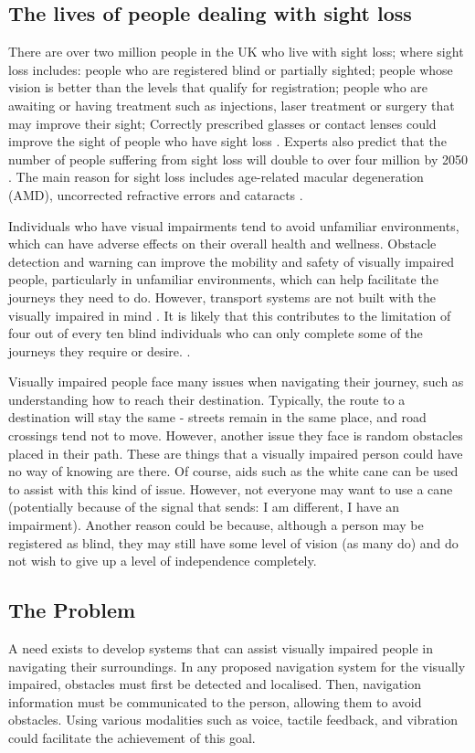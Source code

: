 \documentclass{svproc}
\begin{document}
\subsection{The lives of people dealing with sight loss}
There are over two million people in the UK who live with sight loss; where sight loss includes: 
people who are registered blind or partially sighted; people whose vision is better than the levels that 
qualify for registration; people who are awaiting or having treatment such as injections, laser treatment or 
surgery that may improve their sight; Correctly prescribed glasses or contact lenses could improve 
the sight of people who have sight loss \cite{b1}. Experts also predict that the number of people 
suffering from sight loss will double to over four million by 2050 \cite{b2}. The main reason for 
sight loss includes age-related macular degeneration (AMD), uncorrected refractive errors and cataracts \cite{b1}. 

Individuals who have visual impairments tend to avoid unfamiliar environments, which can have adverse effects 
on their overall health and wellness. Obstacle detection and warning can improve the mobility and safety of 
visually impaired people, particularly in unfamiliar environments, which can help facilitate the journeys they 
need to do. However, transport systems are not built with the visually impaired in mind \cite{b2}. 
It is likely that this contributes to the limitation of four out of every ten blind individuals who can 
only complete some of the journeys they require or desire. \cite{b1}.

Visually impaired people face many issues when navigating their journey, such as understanding 
how to reach their destination. Typically, the route to a destination will stay the same - streets 
remain in the same place, and road crossings tend not to move. However, another issue they face is 
random obstacles placed in their path. These are things that a visually impaired person could have no way 
of knowing are there. Of course, aids such as the white cane can be used to assist with this kind of issue. 
However, not everyone may want to use a cane (potentially because of the signal that sends: I am different, I have an impairment). 
Another reason could be because, although a person may be registered as blind, they may still have some 
level of vision (as many do) and do not wish to give up a level of independence completely. 

\subsection{The Problem}
A need exists to develop systems that can assist visually impaired people in navigating their surroundings. 
In any proposed navigation system for the visually impaired, obstacles must first be detected and localised. 
Then, navigation information must be communicated to the person, allowing them to avoid obstacles. 
Using various modalities such as voice, tactile feedback, and vibration could facilitate the achievement of this goal.
 
\end{document}

